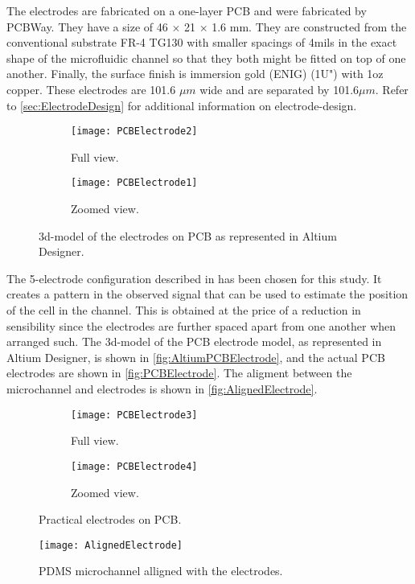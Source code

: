 The electrodes are fabricated on a one-layer PCB and were fabricated by PCBWay. They have a size of 46 $\times$ 21 $\times$ 1.6 mm. They are constructed from the conventional substrate FR-4 TG130 with smaller spacings of 4mils in the exact shape of the microfluidic channel so that they both might be fitted on top of one another. Finally, the surface finish is immersion gold (ENIG) (1U") with 1oz copper. These electrodes are 101.6 $\mu m$ wide and are separated by 101.6$\mu m$. Refer to \autoref{sec:ElectrodeDesign} for additional information on electrode-design. \par
\begin{figure}[h]
\centering
\begin{subfigure}{0.49\textwidth}
\centering
    \texttt{[image: PCBElectrode2]}
    \caption{Full view.}
    \label{fig:PCBElectrode2}
\end{subfigure}
\begin{subfigure}{0.49\textwidth}
\centering
    \texttt{[image: PCBElectrode1]}
    \caption{Zoomed view.}
    \label{fig:PCBElectrode1}
\end{subfigure}
\caption{3d-model of the electrodes on PCB as represented in Altium Designer.}
\label{fig:AltiumPCBElectrode}
\end{figure}

The 5-electrode configuration described in \citep{De_Ninno2017} has been chosen for this study. It creates a pattern in the observed signal that can be used to estimate the position of the cell in the channel. This is obtained at the price of a reduction in sensibility since the electrodes are further spaced apart from one another when arranged such. The 3d-model of the PCB electrode model, as represented in Altium Designer, is shown in \autoref{fig:AltiumPCBElectrode}, and the actual PCB electrodes are shown in \autoref{fig:PCBElectrode}. The aligment between the microchannel and electrodes is shown in \autoref{fig:AlignedElectrode}.

\begin{figure}[h]
\centering
\begin{subfigure}{0.49\textwidth}
\centering
    \texttt{[image: PCBElectrode3]}
    \caption{Full view.}
    \label{fig:PCBElectrode3}
\end{subfigure}
\begin{subfigure}{0.49\textwidth}
\centering
    \texttt{[image: PCBElectrode4]}
    \caption{Zoomed view.}
    \label{fig:PCBElectrode4}
\end{subfigure}
\caption{Practical electrodes on PCB.}
\label{fig:PCBElectrode}
\end{figure}

\begin{figure}[h]
    \centering
    \texttt{[image: AlignedElectrode]}
    \caption{PDMS microchannel alligned with the electrodes. }
    \label{fig:AlignedElectrode}
\end{figure}